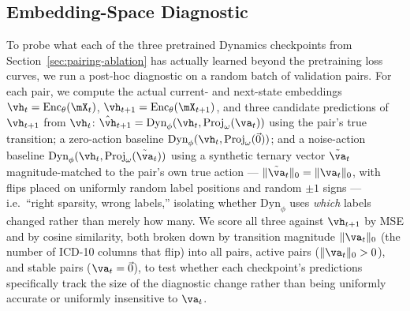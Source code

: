 \subsection{Embedding-Space Diagnostic}
\label{sec:embedding-diagnostic}

To probe what each of the three pretrained Dynamics checkpoints from Section~\ref{sec:pairing-ablation} has actually learned beyond the pretraining loss curves, we run a post-hoc diagnostic on a random batch of validation pairs. For each pair, we compute the actual current- and next-state embeddings $\vh_t=\text{Enc}_\theta(\mX_t)$, $\vh_{t+1}=\text{Enc}_\theta(\mX_{t+1})$, and three candidate predictions of $\vh_{t+1}$ from $\vh_t$: $\hat{\vh}_{t+1}=\text{Dyn}_\phi(\vh_t,\text{Proj}_\omega(\va_t))$ using the pair's true transition; a zero-action baseline $\text{Dyn}_\phi(\vh_t,\text{Proj}_\omega(\vec{0}))$; and a noise-action baseline $\text{Dyn}_\phi(\vh_t,\text{Proj}_\omega(\tilde{\va}_t))$ using a synthetic ternary vector $\tilde{\va}_t$ magnitude-matched to the pair's own true action — $\lVert\tilde{\va}_t\rVert_0=\lVert\va_t\rVert_0$, with flips placed on uniformly random label positions and random $\pm1$ signs — i.e.\ ``right sparsity, wrong labels,'' isolating whether $\text{Dyn}_\phi$ uses \emph{which} labels changed rather than merely how many. We score all three against $\vh_{t+1}$ by MSE and by cosine similarity, both broken down by transition magnitude $\lVert\va_t\rVert_0$ (the number of ICD-10 columns that flip) into all pairs, active pairs ($\lVert\va_t\rVert_0>0$), and stable pairs ($\va_t=\vec{0}$), to test whether each checkpoint's predictions specifically track the size of the diagnostic change rather than being uniformly accurate or uniformly insensitive to $\va_t$.



